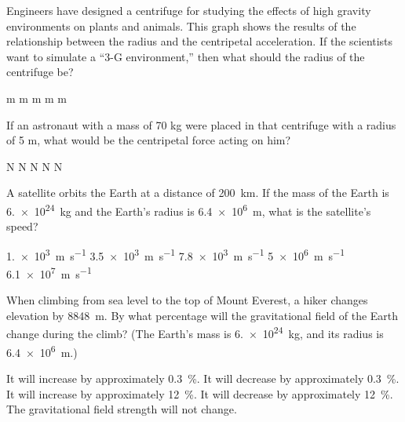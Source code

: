 \documentclass{../../../oss-ap12ibhl-print}
\begin{document}
\begin{questions}
  \question Engineers have designed a centrifuge for studying the effects of
  high gravity environments on plants and animals. This graph shows the results
  of the relationship between the radius and the centripetal acceleration. If
  the scientists want to simulate a ``3-G environment,'' then what should the
  radius of the centrifuge be?
  \label{centrifugal1}
  \begin{choices}
     m
     m
     m
     m
     m
  \end{choices}
    
  \question If an astronaut with a mass of 70 kg were placed in that centrifuge
  with a radius of 5 m, what would be the centripetal force acting on him?
  \label{centrifugal2}
  \begin{choices}
     N
     N
     N
     N
     N
  \end{choices}
  \newpage
  
  \question A satellite orbits the Earth at a distance of
  \SI{200}{\kilo\metre}. If the mass of the Earth is \SI{6.e24}{\kilo\gram} and
  the Earth's radius is \SI{6.4e6}{\metre}, what is the satellite's speed?
  \begin{choices}
    \choice\SI{1.e3}{\metre\per\second}
    \choice\SI{3.5e3}{\metre\per\second}
    \choice\SI{7.8e3}{\metre\per\second}
    \choice\SI{5e6}{\metre\per\second}
    \choice\SI{6.1e7}{\metre\per\second}
  \end{choices}
    
  \question When climbing from sea level to the top of Mount Everest, a hiker
  changes elevation by \SI{8848}{\metre}. By what percentage will the
  gravitational field of the Earth change during the climb? (The Earth's mass
  is \SI{6.e24}{\kilo\gram}, and its radius is \SI{6.4e6}{\metre}.)
  \begin{choices}
    \choice It will increase by approximately \SI{.3}{\percent}.
    \choice It will decrease by approximately \SI{.3}{\percent}.
    \choice It will increase by approximately \SI{12}{\percent}.
    \choice It will decrease by approximately \SI{12}{\percent}.
    \choice The gravitational field strength will not change.
  \end{choices}


\end{questions}
\end{document}
